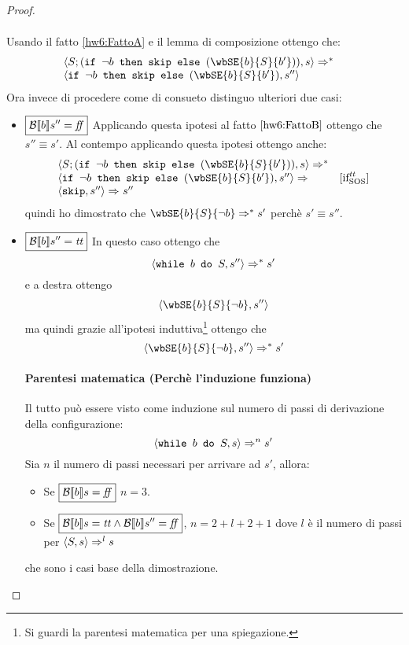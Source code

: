 {\begin{enumerate}
\begin{proof}
\begin{itemize}
$$\begin{array}{ll}
\end{array}
$$
Usando il fatto \ref{hw6:FattoA}  e il lemma di composizione ottengo che:
$$
\begin{array}{ll}
\confSs{S; (\ifABC{\neg b}{\skipForFriends}{(\wbSE{b}{S}{b'})})}{s} \Rar{*} & \\
\confSs{\ifABC{\neg b}{\skipForFriends}{(\wbSE{b}{S}{b'})}}{s''}
\end{array}
$$
Ora invece di procedere come di consueto distinguo ulteriori due casi:
\begin{itemize}
\item $\boxed{\mathcal{B} \llbracket b \rrbracket s'' = \mbox{\textit{ff}}}$
Applicando questa ipotesi al fatto $\ref{hw6:FattoB}$ ottengo che $\boxed{s'' \equiv s'}$.
Al contempo applicando questa ipotesi ottengo anche:
$$
\begin{array}{ll}
	\confSs{S; (\ifABC{\neg b}{\skipForFriends}{(\wbSE{b}{S}{b'})})}{s} \Rar{*} & \\
	\confSs{\ifABC{\neg b}{\skipForFriends}{(\wbSE{b}{S}{b'})}}{s''} \Rar{} & \ifttSOS \\
	\confSs{\skipForFriends}{s''} \Rar{ } s'' & \\
\end{array}
$$
quindi ho dimostrato che $\wbSE{b}{S}{\neg b} \Rar{*} s'$ perchè $s' \equiv s''$.
\item $\boxed{\mathcal{B} \llbracket b \rrbracket s'' = \mbox{\textit{tt}}}$	
In questo caso ottengo che
$$
\langle{}\mbox{\normalfont{\texttt{while }}} b \textrm{\normalfont{\texttt{ do }}} S, s''\rangle{} \Rightarrow^{*} s'
$$
e a destra ottengo
$$
\confSs{\wbSE{b}{S}{\neg b}}{s''}
$$
ma quindi grazie all'ipotesi induttiva\footnote{Si guardi la parentesi matematica per una spiegazione.} ottengo che
$$
\confSs{\wbSE{b}{S}{\neg b}}{s''} \Rar{*} s'
$$
\paragraph{Parentesi matematica (Perchè l'induzione funziona)}

Il tutto può essere visto come induzione sul numero di passi di derivazione
della configurazione: $$\langle{}\mbox{\normalfont{\texttt{while }}} b \textrm{\normalfont{\texttt{ do }}} S, s\rangle{} \Rightarrow^{n} s'$$
Sia $n$ il numero di passi necessari per arrivare ad $s'$, allora:
\begin{itemize}
\item Se $\boxed{\mathcal{B} \llbracket b \rrbracket s = \mbox{\textit{ff}}}$ $n = 3$.
\item Se $\boxed{\mathcal{B} \llbracket b \rrbracket s = \mbox{\textit{tt}} \land \mathcal{B} \llbracket b \rrbracket s'' = \mbox{\textit{ff}}}$, $n = 2 + l + 2 + 1$ dove $l$ è il numero
di passi per $\langle{}S, s\rangle{} \Rightarrow^{l} s$
\end{itemize}
che sono i casi base della dimostrazione.


\end{itemize}
\end{itemize}
\end{proof}
\end{enumerate}}
